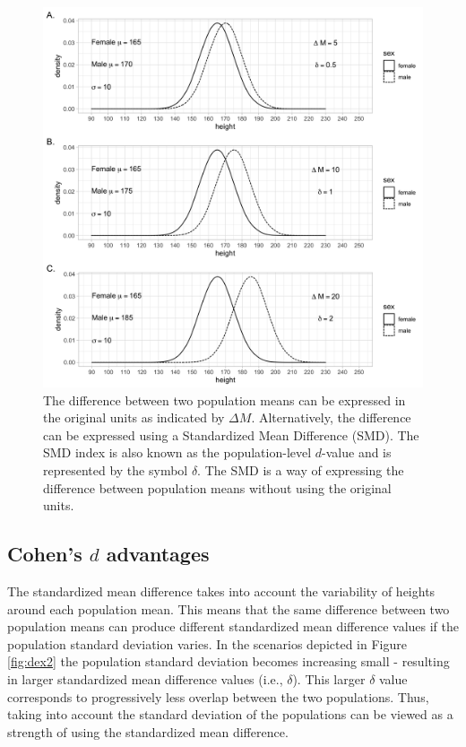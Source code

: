\documentclass[
]{krantz}
\begin{document}
\begin{figure}
\includegraphics[width=1\linewidth]{ch_populations/images/dvalue_ex1} \caption{The difference between two population means can be expressed in the original units as indicated by $\Delta M$. Alternatively, the difference can be expressed using a Standardized Mean Difference (SMD). The SMD index is also known as the population-level $d$-value and is represented by the symbol $\delta$. The SMD is a way of expressing the difference between population means without using the original units. }\label{fig:dex1}
\end{figure}

\hypertarget{cohens-d-advantages}{%
\subsection{\texorpdfstring{Cohen's \(d\) advantages}{Cohen's d advantages}}\label{cohens-d-advantages}}

The standardized mean difference takes into account the variability of heights around each population mean. This means that the same difference between two population means can produce different standardized mean difference values if the population standard deviation varies. In the scenarios depicted in Figure \ref{fig:dex2} the population standard deviation becomes increasing small - resulting in larger standardized mean difference values (i.e., \(\delta\)). This larger \(\delta\) value corresponds to progressively less overlap between the two populations. Thus, taking into account the standard deviation of the populations can be viewed as a strength of using the standardized mean difference.
\end{document}
